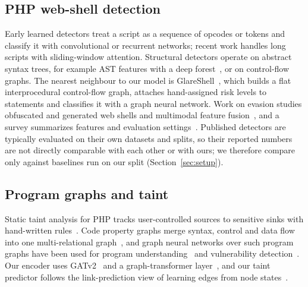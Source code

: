 \documentclass[pdflatex,sn-mathphys-num]{sn-jnl}
\begin{document}
\subsection{PHP web-shell detection}
Early learned detectors treat a script as a sequence of opcodes or tokens and
classify it with convolutional or recurrent networks; recent work handles long
scripts with sliding-window attention. Structural detectors operate on
abstract syntax trees, for example AST features with a deep
forest~\cite{astdf2024}, or on control-flow graphs. The nearest neighbour to
our model is GlareShell~\cite{glareshell2024}, which builds a flat
interprocedural control-flow graph, attaches hand-assigned risk levels to
statements and classifies it with a graph neural network. Work on evasion
studies obfuscated and generated web shells and multimodal feature
fusion~\cite{mmfdetect2025}, and a survey summarizes features and evaluation
settings~\cite{survey2024}. Published detectors are typically evaluated on
their own datasets and splits, so their reported numbers are not directly
comparable with each other or with ours; we therefore compare only against
baselines run on our split (Section~\ref{sec:setup}).

\subsection{Program graphs and taint}
Static taint analysis for PHP tracks user-controlled sources to sensitive
sinks with hand-written rules~\cite{jovanovic2006pixy}. Code property graphs
merge syntax, control and data flow into one multi-relational
graph~\cite{yamaguchi2014cpg}, and graph neural networks over such program
graphs have been used for program understanding~\cite{allamanis2018graphs} and
vulnerability detection~\cite{zhou2019devign}. Our encoder uses
GATv2~\cite{brody2022gatv2} and a graph-transformer
layer~\cite{shi2021unimp}, and our taint predictor follows the link-prediction
view of learning edges from node states~\cite{zhang2018seal}.
\end{document}
